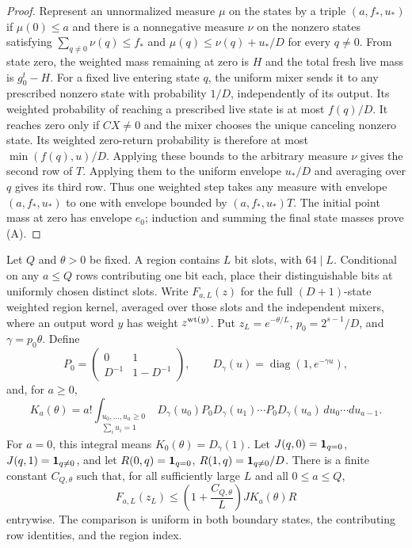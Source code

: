 \begin{proof}
Represent an unnormalized measure $\mu$ on the states by a triple
$(a,f_*,u_*)$ if $\mu(0)\le a$ and there is a nonnegative measure
$\nu$ on the nonzero states satisfying
$\sum_{q\ne0}\nu(q)\le f_*$ and
$\mu(q)\le\nu(q)+u_*/D$ for every $q\ne0$.
From state zero, the weighted mass remaining at zero is $H$ and the
total fresh live mass is $g_0^t-H$. For a fixed live entering state
$q$, the uniform mixer sends it to any prescribed nonzero state with
probability $1/D$, independently of its output. Its weighted
probability of reaching a prescribed live state is at most $f(q)/D$.
It reaches zero only if $CX\ne0$ and the mixer chooses the unique
canceling nonzero state. Its weighted zero-return probability is
therefore at most $\min(f(q),u)/D$. Applying these bounds to the
arbitrary measure $\nu$ gives the second row of $T$. Applying them
to the uniform envelope $u_*/D$ and averaging over $q$ gives its
third row. Thus one weighted step takes any measure with envelope
$(a,f_*,u_*)$ to one with envelope bounded by
$(a,f_*,u_*)T$. The initial point mass at zero has envelope $e_0$;
induction and summing the final state masses prove (A).
\end{proof}

\begin{lemma}
\label{lem:shared-inner-fixed-region}
Let $Q$ and $\theta>0$ be fixed. A region contains $L$ bit slots, with
$64\mid L$. Conditional on any $a\le Q$ rows contributing one bit each,
place their distinguishable bits at uniformly chosen distinct slots.
Write $F_{a,L}(z)$ for the full $(D+1)$-state weighted region kernel,
averaged over those slots and the independent mixers, where an output
word $y$ has weight $z^{\operatorname{wt}(y)}$. Put $z_L=e^{-\theta/L}$,
$p_0=2^{s-1}/D$, and $\gamma=p_0\theta$. Define
\[
 P_0=\begin{pmatrix}0&1\\D^{-1}&1-D^{-1}\end{pmatrix},\qquad
 D_\gamma(u)=\operatorname{diag}(1,e^{-\gamma u}),
\]
and, for $a\ge0$,
\[
 K_a(\theta)=a!\int_{\substack{u_0,\ldots,u_a\ge0\\
                                  \sum_i u_i=1}}
 D_\gamma(u_0)P_0D_\gamma(u_1)\cdots P_0D_\gamma(u_a)
 \,du_0\cdots du_{a-1}.
\]
For $a=0$, this integral means $K_0(\theta)=D_\gamma(1)$.
Let $J(q,0)=\mathbf 1_{q=0}$, $J(q,1)=\mathbf 1_{q\ne0}$, and let
$R(0,q)=\mathbf 1_{q=0}$, $R(1,q)=\mathbf 1_{q\ne0}/D$. There is a finite constant
$C_{Q,\theta}$ such that, for all sufficiently large $L$ and all
$0\le a\le Q$,
\[
 F_{a,L}(z_L)\le
 \left(1+\frac{C_{Q,\theta}}L\right)J K_a(\theta)R
 \tag{1}
\]
entrywise. The comparison is uniform in both boundary states, the
contributing row identities, and the region index.
\end{lemma}

